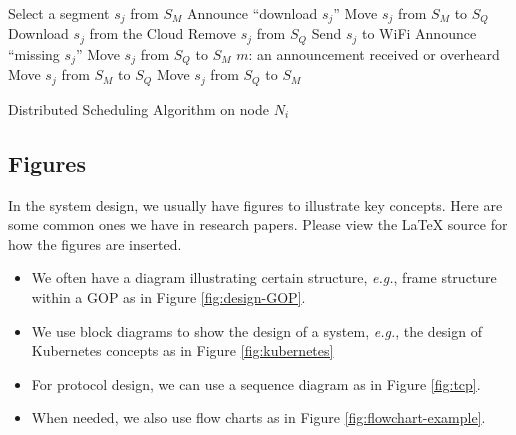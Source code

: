 \begin{algorithm}
    \label{alg:sched}
    \begin{algorithmic}[1]
        \Statex
                \State Select a segment $s_j$ from $S_M$
                \State Announce ``download $s_j$''
                \State Move $s_j$ from $S_M$ to $S_Q$
                \State Download $s_j$ from the Cloud
            \EndIf  
            \Statex
                \State Remove $s_j$ from $S_Q$
                    \State Send $s_j$ to WiFi
                \EndIf
            \EndIf
            \Statex
                \State Announce ``missing $s_j$''
                \State Move $s_j$ from $S_Q$ to $S_M$
            \EndIf  
            \Statex
            \State $m$: an announcement received or overheard
                \State Move $s_j$ from $S_M$ to $S_Q$
                \State Move $s_j$ from $S_Q$ to $S_M$
            \EndIf
        \EndWhile
    \end{algorithmic}
\caption{Distributed Scheduling Algorithm on node $N_i$}
\end{algorithm}

\subsection{Figures}
\label{sec:design-figure}

In the system design, we usually have figures to illustrate key concepts.  Here are some common ones we have in research papers.  Please view the LaTeX source for how the figures are inserted.

\begin{itemize}
    \item We often have a diagram illustrating certain structure, {\em e.g.}, frame structure within a GOP as in Figure \ref{fig:design-GOP}.  

    \item We use block diagrams to show the design of a system, {\em e.g.}, the design of Kubernetes concepts as in Figure \ref{fig:kubernetes}
    
    \item For protocol design, we can use a sequence diagram as in Figure \ref{fig:tcp}.
    
    \item When needed, we also use flow charts as in Figure \ref{fig:flowchart-example}.

\end{itemize}

